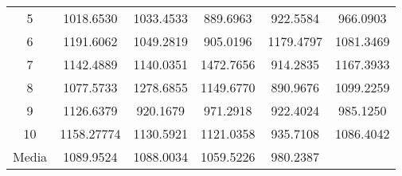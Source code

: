 \documentclass[12pt,a4paper,twoside,openright,titlepage,final]{article}
\begin{document}
\begin{table}[htbp!]
\begin{tabular}{@{}cccccc@{}}
		5                           & 1018.6530                                                      & 1033.4533                                                       & \cellcolor[HTML]{FFFE65}889.6963                             & 922.5584                                                & 966.0903                \\
		6                           & 1191.6062                                                      & 1049.2819                                                       & \cellcolor[HTML]{FFFE65}905.0196                             & 1179.4797                                               & 1081.3469               \\
		7                           & 1142.4889                                                      & 1140.0351                                                       & 1472.7656                                                    & \cellcolor[HTML]{FFFE65}914.2835                        & 1167.3933               \\
		8                           & 1077.5733                                                      & 1278.6855                                                       & 1149.6770                                                    & \cellcolor[HTML]{FFFE65}890.9676                        & 1099.2259               \\
		9                           & 1126.6379                                                      & \cellcolor[HTML]{FFFE65}920.1679                                & 971.2918                                                     & 922.4024                                                & 985.1250                \\
		10                          & 1158.27774                                                     & 1130.5921                                                       & 1121.0358                                                    & \cellcolor[HTML]{FFFE65}935.7108                        & 1086.4042               \\ \midrule
		Media                       & 1089.9524                                                      & 1088.0034                                                       & 1059.5226                                                    & 980.2387                                                & \multicolumn{1}{l}{}    \\ \bottomrule
	\end{tabular}
\end{table}
\end{document}
